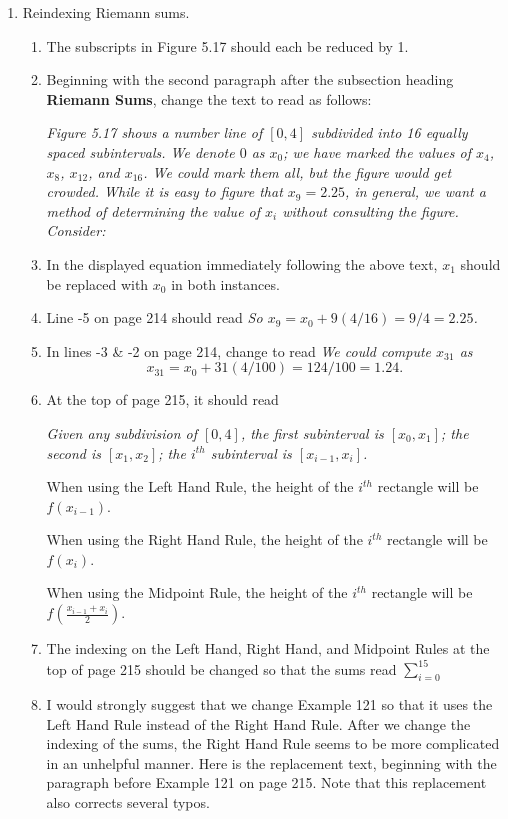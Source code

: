 \documentclass[11pt]{report}
\begin{document}
\begin{enumerate}
\item Reindexing Riemann sums. 
\begin{enumerate}
\item The subscripts in Figure 5.17 should each be reduced by 1.

\item Beginning with the second paragraph after the subsection heading {\bfseries Riemann Sums}, change the text to read as follows:

{\slshape Figure 5.17 shows a number line of $[0,4]$ subdivided into 16 equally spaced subintervals. We denote $0$ as $x_0$; we have marked the values of $x_4$, $x_8$, $x_{12}$, and $x_{16}$. We could mark them all, but the figure would get crowded. While it is easy to figure that $x_9=2.25$, in general, we want a method of determining the value of $x_i$ without consulting the figure. Consider:}

\item In the displayed equation immediately following the above text, $x_1$ should be replaced with $x_0$ in both instances.

\item Line -5 on page 214 should read \emph{So $x_9=x_0+9(4/16)=9/4=2.25$.}

\item In lines -3 \& -2 on page 214, change to read \emph{We could compute $x_{31}$ as \[x_{31}=x_0+31(4/100)=124/100=1.24.\]}

\item At the top of page 215, it should read {\slshape Given any subdivision of $[0,4]$, the first subinterval is $[x_0,x_1]$; the second is $[x_1,x_2]$; the $i^{th}$ subinterval is $[x_{i-1},x_i]$.

When using the Left Hand Rule, the height of the $i^{th}$ rectangle will be $f(x_{i-1})$.

When using the Right Hand Rule, the height of the $i^{th}$ rectangle will be $f(x_i)$.

When using the Midpoint Rule, the height of the $i^{th}$ rectangle will be $f\left(\frac{x_{i-1}+x_i}{2}\right)$.}

\item The indexing on the Left Hand, Right Hand, and Midpoint Rules at the top of page 215 should be changed so that the sums read $\displaystyle\sum_{i=0}^{15}$

\item I would strongly suggest that we change Example 121 so that it uses the Left Hand Rule instead of the Right Hand Rule. After we change the indexing of the sums, the Right Hand Rule seems to be more complicated in an unhelpful manner. Here is the replacement text, beginning with the paragraph before Example 121 on page 215. Note that this replacement also corrects several typos.


\end{enumerate}
\end{enumerate}
\end{document}

